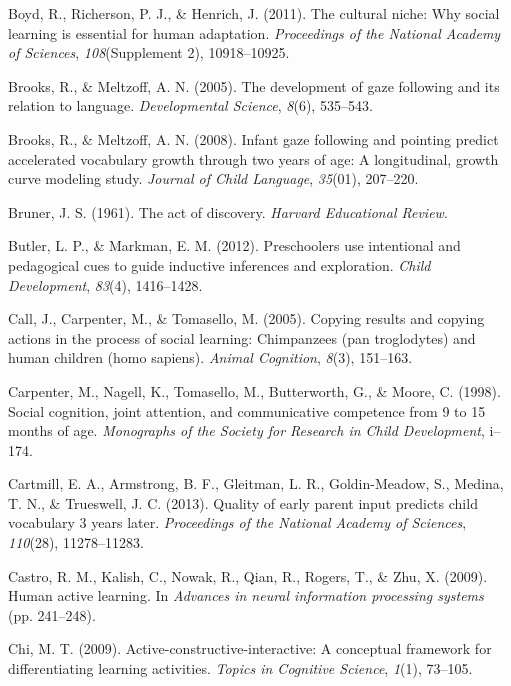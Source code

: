 \documentclass[oneside]{report}
\begin{document}
\hypertarget{ref-boyd2011cultural}{}
Boyd, R., Richerson, P. J., \& Henrich, J. (2011). The cultural niche:
Why social learning is essential for human adaptation. \emph{Proceedings
of the National Academy of Sciences}, \emph{108}(Supplement 2),
10918--10925.

\hypertarget{ref-brooks2005development}{}
Brooks, R., \& Meltzoff, A. N. (2005). The development of gaze following
and its relation to language. \emph{Developmental Science}, \emph{8}(6),
535--543.

\hypertarget{ref-brooks2008infant}{}
Brooks, R., \& Meltzoff, A. N. (2008). Infant gaze following and
pointing predict accelerated vocabulary growth through two years of age:
A longitudinal, growth curve modeling study. \emph{Journal of Child
Language}, \emph{35}(01), 207--220.

\hypertarget{ref-bruner1961act}{}
Bruner, J. S. (1961). The act of discovery. \emph{Harvard Educational
Review}.

\hypertarget{ref-butler2012preschoolers}{}
Butler, L. P., \& Markman, E. M. (2012). Preschoolers use intentional
and pedagogical cues to guide inductive inferences and exploration.
\emph{Child Development}, \emph{83}(4), 1416--1428.

\hypertarget{ref-call2005copying}{}
Call, J., Carpenter, M., \& Tomasello, M. (2005). Copying results and
copying actions in the process of social learning: Chimpanzees (pan
troglodytes) and human children (homo sapiens). \emph{Animal Cognition},
\emph{8}(3), 151--163.

\hypertarget{ref-carpenter1998social}{}
Carpenter, M., Nagell, K., Tomasello, M., Butterworth, G., \& Moore, C.
(1998). Social cognition, joint attention, and communicative competence
from 9 to 15 months of age. \emph{Monographs of the Society for Research
in Child Development}, i--174.

\hypertarget{ref-cartmill2013quality}{}
Cartmill, E. A., Armstrong, B. F., Gleitman, L. R., Goldin-Meadow, S.,
Medina, T. N., \& Trueswell, J. C. (2013). Quality of early parent input
predicts child vocabulary 3 years later. \emph{Proceedings of the
National Academy of Sciences}, \emph{110}(28), 11278--11283.

\hypertarget{ref-castro2009human}{}
Castro, R. M., Kalish, C., Nowak, R., Qian, R., Rogers, T., \& Zhu, X.
(2009). Human active learning. In \emph{Advances in neural information
processing systems} (pp. 241--248).

\hypertarget{ref-chi2009active}{}
Chi, M. T. (2009). Active-constructive-interactive: A conceptual
framework for differentiating learning activities. \emph{Topics in
Cognitive Science}, \emph{1}(1), 73--105.
\end{document}
